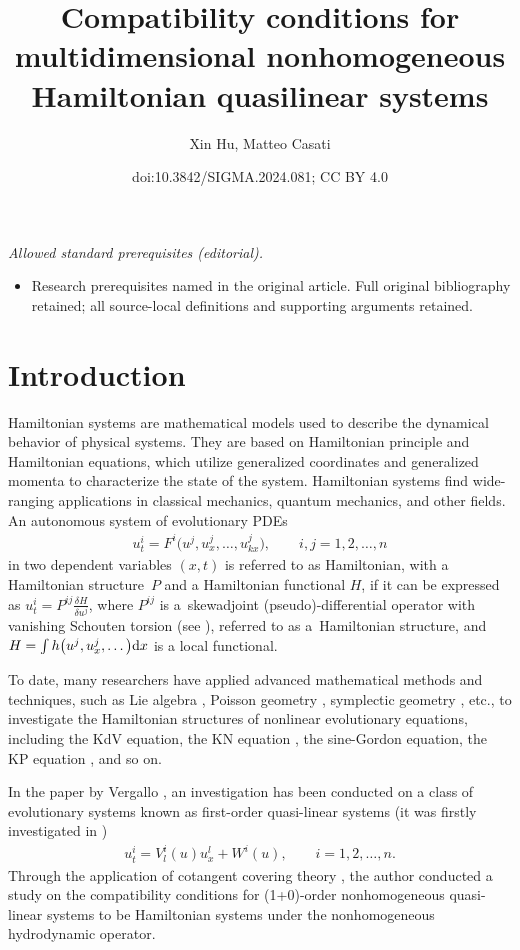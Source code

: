 \documentclass[10pt,a4paper]{amsart}
\title{Compatibility conditions for multidimensional nonhomogeneous Hamiltonian quasilinear systems}
\author{Xin Hu, Matteo Casati}
\date{doi:10.3842/SIGMA.2024.081; CC BY 4.0}
\numberwithin{equation}{section}
\begin{document}
\maketitle
\noindent\textit{Allowed standard prerequisites (editorial).}\begin{itemize}
\item Research prerequisites named in the original article. Full original bibliography retained; all source-local definitions and supporting arguments retained.
\end{itemize}\medskip
\section{Introduction}
Hamiltonian systems are mathematical models used to describe the dynamical behavior of physical systems. They are based on Hamiltonian principle and Hamiltonian equations, which utilize generalized coordinates and generalized momenta to characterize the state of the system. Hamiltonian systems find wide-ranging applications in classical mechanics, quantum mechanics, and other fields. An autonomous system of evolutionary PDEs
\begin{gather*}
u^i_t=F^i\big(u^j,u^j_x,\dots,u^j_{kx}\big), \qquad i,j=1,2,\dots,n
\end{gather*}
in two dependent variables $(x,t)$ is referred to as Hamiltonian, with a Hamiltonian structure~$P$ and a Hamiltonian functional $H$, if it can be
expressed as
$
u^i_t=P^{ij}\frac{\delta H}{\delta u^j}$,
where $P^{ij}$ is a~skewadjoint (pseudo)-differential operator with vanishing Schouten torsion (see \cite{olver1993applications}), referred to as a~Hamiltonian structure, and $H=\int h\big(u^j,u^j_x,\dots\big) {\rm d}x$ is a local functional.

To date, many researchers have applied advanced mathematical methods and techniques, such as Lie algebra \cite{olver1993applications}, Poisson geometry \cite{weinstein1983local}, symplectic geometry \cite{mokhov1995symplectic}, etc., to investigate the Hamiltonian structures of nonlinear evolutionary equations, including the KdV equation, the KN equation \cite{mokhov1995symplectic}, the sine-Gordon equation, the KP equation \cite{dubrovin2001integrable,olver1980hamiltonian}, and so on.

In the paper by Vergallo \cite{vergallo2023non}, an investigation has been conducted on a class of evolutionary systems known as first-order quasi-linear systems (it was firstly investigated in \cite{Vergallo_2022})
\begin{gather*}
u^i_t=V^i_l(u)u^l_x+W^i(u), \qquad i=1,2,\dots, n.
\end{gather*}
Through the application of cotangent covering theory \cite{krasil1989nonlocal,vergallo2021homogeneous}, the author conducted a study on the compatibility conditions for (1+0)-order nonhomogeneous quasi-linear systems to be Hamiltonian systems under the nonhomogeneous hydrodynamic operator.
\end{document}
